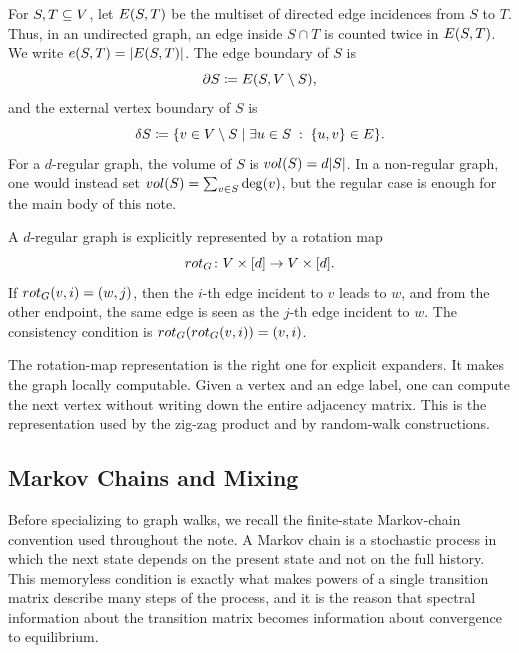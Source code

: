 For \(S,T\subseteq V\), let \(E(S,T)\) be the multiset of directed edge incidences from \(S\) to \(T\). Thus, in an undirected graph, an edge inside \(S\cap T\) is counted twice in \(E(S,T)\). We write \(e(S,T)=\lvert E(S,T)\rvert\). The edge boundary of \(S\) is
\begin{equation}
	\partial S \coloneqq E(S,V\setminus S),
\end{equation}
and the external vertex boundary of \(S\) is
\begin{equation}
	\delta S \coloneqq \{v\in V\setminus S \mid \exists u\in S \;:\; \{u,v\}\in E\}.
\end{equation}
For a \(d\)-regular graph, the volume of \(S\) is \(vol(S)=d\lvert S\rvert\). In a non-regular graph, one would instead set \(vol(S)=\sum_{v\in S}\deg(v)\), but the regular case is enough for the main body of this note.

\begin{definition}
	\label{def:rotation-map}
	A \(d\)-regular graph is explicitly represented by a rotation map
	\begin{equation}
		rot_{G} \colon V\times[d]\to V\times[d].
	\end{equation}
	If \(rot_{G}(v,i)=(w,j)\), then the \(i\)-th edge incident to \(v\) leads to \(w\), and from the other endpoint, the same edge is seen as the \(j\)-th edge incident to \(w\). The consistency condition is \(rot_{G}(rot_{G}(v,i))=(v,i)\).
\end{definition}

The rotation-map representation is the right one for explicit expanders. It makes the graph locally computable. Given a vertex and an edge label, one can compute the next vertex without writing down the entire adjacency matrix. This is the representation used by the zig-zag product and by random-walk constructions.

\subsection{Markov Chains and Mixing}
\label{subsec:markov-chains}

Before specializing to graph walks, we recall the finite-state Markov-chain convention used throughout the note. A Markov chain is a stochastic process in which the next state depends on the present state and not on the full history. This memoryless condition is exactly what makes powers of a single transition matrix describe many steps of the process, and it is the reason that spectral information about the transition matrix becomes information about convergence to equilibrium.

